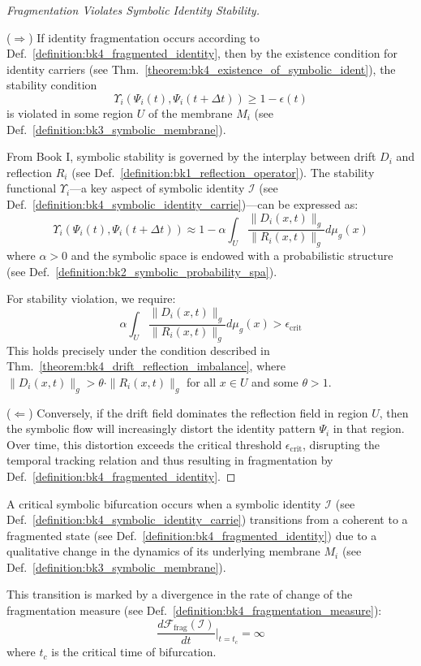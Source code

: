 \begin{proof}[Fragmentation Violates Symbolic Identity Stability]
\label{proof:bk4_fragmentation_identity_stability}
\leavevmode

($\Rightarrow$) If identity fragmentation occurs according to Def.~\ref{definition:bk4_fragmented_identity}, then by the existence condition for identity carriers (see Thm.~\ref{theorem:bk4_existence_of_symbolic_ident}), the stability condition 
\[
\Upsilon_i(\Psi_i(t), \Psi_i(t+\Delta t)) \geq 1 - \epsilon(t)
\]
is violated in some region $U$ of the membrane $M_i$ (see Def.~\ref{definition:bk3_symbolic_membrane}).

From Book I, symbolic stability is governed by the interplay between drift $D_i$ and reflection $R_i$ (see Def.~\ref{definition:bk1_reflection_operator}). The stability functional $\Upsilon_i$---a key aspect of symbolic identity $\mathcal{I}$ (see Def.~\ref{definition:bk4_symbolic_identity_carrie})---can be expressed as:
\[
\Upsilon_i(\Psi_i(t), \Psi_i(t+\Delta t)) \approx 1 - \alpha \int_U \frac{\|D_i(x,t)\|_g}{\|R_i(x,t)\|_g} d\mu_g(x)
\]
where $\alpha > 0$ and the symbolic space is endowed with a probabilistic structure (see Def.~\ref{definition:bk2_symbolic_probability_spa}).

For stability violation, we require:
\[
\alpha \int_U \frac{\|D_i(x,t)\|_g}{\|R_i(x,t)\|_g} d\mu_g(x) > \epsilon_{\text{crit}}
\]
This holds precisely under the condition described in Thm.~\ref{theorem:bk4_drift_reflection_imbalance}, where $\|D_i(x,t)\|_g > \theta \cdot \|R_i(x,t)\|_g$ for all $x \in U$ and some $\theta > 1$.

($\Leftarrow$) Conversely, if the drift field dominates the reflection field in region $U$, then the symbolic flow will increasingly distort the identity pattern $\Psi_i$ in that region. Over time, this distortion exceeds the critical threshold $\epsilon_{\text{crit}}$, disrupting the temporal tracking relation and thus resulting in fragmentation by Def.~\ref{definition:bk4_fragmented_identity}.

\end{proof}
\begin{definition} \label{definition:bk4_critical_symbolic_bifurc}
A critical symbolic bifurcation occurs when a symbolic identity $\mathcal{I}$ (see Def.~\ref{definition:bk4_symbolic_identity_carrie}) transitions from a coherent to a fragmented state (see Def.~\ref{definition:bk4_fragmented_identity}) due to a qualitative change in the dynamics of its underlying membrane $M_i$ (see Def.~\ref{definition:bk3_symbolic_membrane}).

This transition is marked by a divergence in the rate of change of the fragmentation measure (see Def.~\ref{definition:bk4_fragmentation_measure}):
\begin{equation}
    \frac{d\mathcal{F}_{\text{frag}}(\mathcal{I})}{dt}\Big|_{t=t_c} = \infty
\end{equation}
where $t_c$ is the critical time of bifurcation.
\end{definition}
